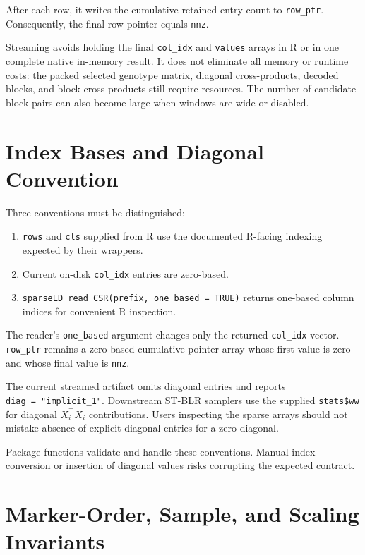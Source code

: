 \documentclass[
  11pt,
  letterpaper,
  DIV=11,
  numbers=noendperiod]{scrartcl}
\providecommand{\tightlist}{%
  \setlength{\itemsep}{0pt}\setlength{\parskip}{0pt}}
\begin{document}
After each row, it writes the cumulative retained-entry count to
\texttt{row\_ptr}. Consequently, the final row pointer equals
\texttt{nnz}.

Streaming avoids holding the final \texttt{col\_idx} and \texttt{values}
arrays in R or in one complete native in-memory result. It does not
eliminate all memory or runtime costs: the packed selected genotype
matrix, diagonal cross-products, decoded blocks, and block
cross-products still require resources. The number of candidate block
pairs can also become large when windows are wide or disabled.

\section{Index Bases and Diagonal
Convention}\label{index-bases-and-diagonal-convention}

Three conventions must be distinguished:

\begin{enumerate}
\def\labelenumi{\arabic{enumi}.}
\tightlist
\item
  \texttt{rows} and \texttt{cls} supplied from R use the documented
  R-facing indexing expected by their wrappers.
\item
  Current on-disk \texttt{col\_idx} entries are zero-based.
\item
  \texttt{sparseLD\_read\_CSR(prefix,\ one\_based\ =\ TRUE)} returns
  one-based column indices for convenient R inspection.
\end{enumerate}

The reader's \texttt{one\_based} argument changes only the returned
\texttt{col\_idx} vector. \texttt{row\_ptr} remains a zero-based
cumulative pointer array whose first value is zero and whose final value
is \texttt{nnz}.

The current streamed artifact omits diagonal entries and reports
\texttt{diag\ =\ "implicit\_1"}. Downstream ST-BLR samplers use the
supplied \texttt{stats\$ww} for diagonal \(X_i^\top X_i\) contributions.
Users inspecting the sparse arrays should not mistake absence of
explicit diagonal entries for a zero diagonal.

Package functions validate and handle these conventions. Manual index
conversion or insertion of diagonal values risks corrupting the expected
contract.

\section{Marker-Order, Sample, and Scaling
Invariants}\label{marker-order-sample-and-scaling-invariants}
\end{document}
